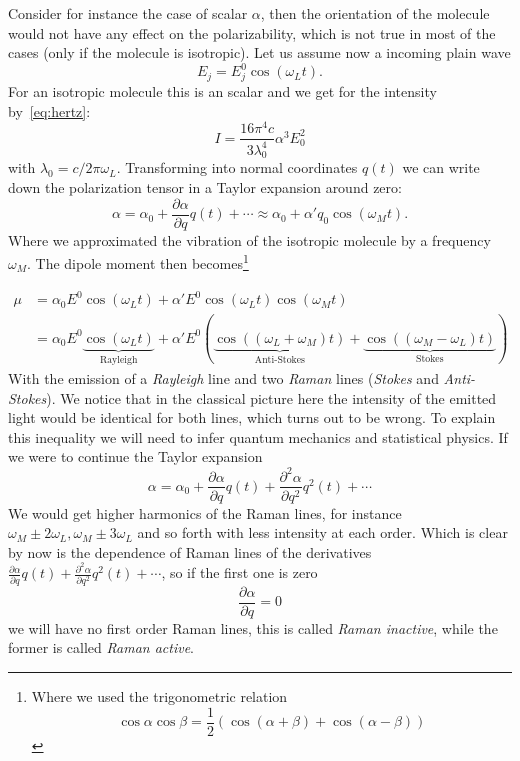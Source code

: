 Consider for instance the case of scalar $\alpha$, then the orientation of the molecule
would not have any effect on the polarizability, which is not true in most of the cases (only
if the molecule is isotropic).
Let us assume now a incoming plain wave 
\begin{equation}
    E_j = E^0_j \cos(\omega_L t).
\end{equation}
For an isotropic molecule this is an scalar and we get
for the intensity by~\eqref{eq:hertz}:
\begin{equation}
    \label{eq:I}
    I = \frac{16 \pi^4 c}{3 \lambda_0^4} \alpha ^3 E_0 ^2
\end{equation}
with $\lambda_0 = c/ 2\pi \omega_L$. Transforming into normal coordinates $q(t)$ we can write down the polarization tensor
in a Taylor expansion around zero\cite{ver}:
\begin{equation}
    \alpha = \alpha_0 + \frac{\partial\alpha}{\partial q}q(t) + \cdots \approx \alpha_0 + \alpha' q_0 \cos(\omega_M t).
\end{equation}
Where we approximated the vibration of the isotropic molecule by a frequency $\omega_M$.
The dipole moment then becomes\footnote{Where we used the trigonometric relation
\begin{equation*}
    \cos\alpha \cos\beta = \frac{1}{2}\left( \cos(\alpha +\beta) + \cos(\alpha -\beta) \right)
\end{equation*}
}

\begin{align}
    \mu &= \alpha_0 E^0 \cos(\omega_L t) + \alpha' E^0 \cos(\omega_L t) \cos(\omega_M t) \\
        &= \alpha_0 E^0 \underbrace{\cos(\omega_L t) }_{\text{Rayleigh}}
    + \alpha' E^0( \underbrace{\cos((\omega_L + \omega_M)t ) }_{\text{Anti-Stokes}}
    + \underbrace{\cos((\omega_M - \omega_L)t)}_{\text{Stokes}} ) 
\end{align}
With the emission of a \textit{Rayleigh} line and two \textit{Raman} lines (\textit{Stokes} and \textit{Anti-Stokes}).
We notice that in the classical picture here the intensity of the emitted light would be identical for both lines, which
turns out to be wrong. To explain this inequality we will need to infer quantum mechanics and statistical physics.
If we were to continue the Taylor expansion
\begin{equation}
    \alpha = \alpha_0 + \frac{\partial\alpha}{\partial q}q(t) + \frac{\partial^2\alpha}{\partial q^2}q^2(t) + \cdots
\end{equation}
We would get higher harmonics of the Raman lines, for instance $\omega_M \pm 2\omega_L, \omega_M \pm 3\omega_L$ and so
forth with less intensity at each order. 
Which is clear by now is the dependence of Raman lines of the
derivatives $\frac{\partial\alpha}{\partial q}q(t) + \frac{\partial^2\alpha}{\partial q^2}q^2(t) + \cdots$, so if 
the first one is zero
\begin{equation}
    \frac{\partial\alpha}{\partial q} = 0
\end{equation}
we will have no first order Raman lines, this is called \textit{Raman inactive}, while the former is called
\textit{Raman active}. 
